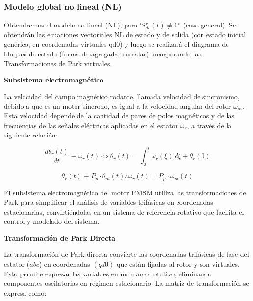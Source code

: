 \documentclass{article}
\begin{document}
\subsubsection{Modelo global no lineal (NL)}

Obtendremos el modelo no lineal (NL), para ``\(i_{ds}^r(t) \neq 0\)'' (caso general). Se obtendrán las ecuaciones vectoriales NL de estado y de salida (con estado inicial genérico, en coordenadas virtuales qd0) y luego se realizará el diagrama de bloques de estado (forma desagregada o escalar) incorporando las Transformaciones de Park virtuales.


\textbf{Subsistema electromagnético}

La velocidad del campo magnético rodante, llamada velocidad de sincronismo, debido a que es un motor síncrono, es igual a la velocidad angular del rotor $\omega_m$. Esta velocidad depende de la cantidad de pares de polos magnéticos y de las frecuencias de las señales eléctricas aplicadas en el estator $\omega_r$, a través de la siguiente relación:

\begin{equation}
    \frac{d\theta_r(t)}{dt} \equiv \omega_r(t) \iff \theta_r(t) = \int_{0}^{t} \omega_r(\xi) \, d\xi + \theta_r(0)
\end{equation}

\begin{equation}
    \theta_r(t) \equiv P_p \cdot \theta_m(t) \therefore \omega_r(t) = P_p \cdot \omega_m(t)
\end{equation}

El subsistema electromagnético del motor PMSM utiliza las transformaciones de Park para simplificar el análisis de variables trifásicas en coordenadas estacionarias, convirtiéndolas en un sistema de referencia rotativo que facilita el control y modelado del sistema.

\textbf{Transformación de Park Directa}

La transformación de Park directa convierte las coordenadas trifásicas de fase del estator (\(abc\)) en coordenadas \((qd0)\) que están fijadas al rotor y son virtuales. Esto permite expresar las variables en un marco rotativo, eliminando componentes oscilatorias en régimen estacionario. La matriz de transformación se expresa como:
\end{document}
